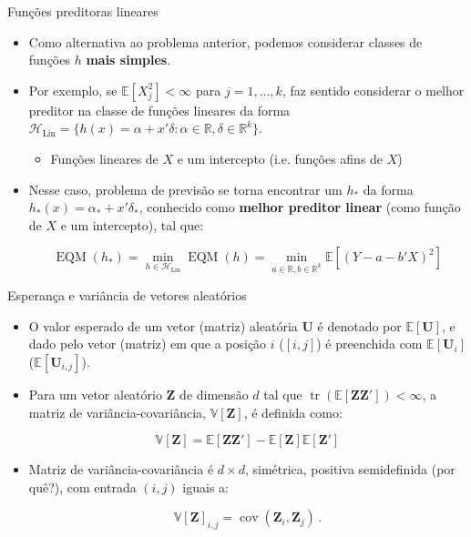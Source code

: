 \documentclass[11pt]{beamer}
\begin{document}
\begin{frame}{Funções preditoras lineares}
	\begin{itemize}
		\item Como alternativa ao problema anterior, podemos considerar classes de funções $h$ \textbf{mais simples}.
		\item Por exemplo, se $\mathbb{E}[X_j^2] < \infty$ para $j=1,\ldots, k$, faz sentido considerar o melhor preditor na classe de funções lineares da forma $\mathcal{H}_{\text{Lin}} = \{h(x) = \alpha + x'\delta: \alpha \in \mathbb{R}, \delta \in \mathbb{R}^k \}$.
				\begin{itemize}
			\item Funções lineares de ${X}$ e um intercepto (i.e. funções afins de ${X}$)
		\end{itemize}
		\item Nesse caso, problema de previsão se torna encontrar um $h_*$ da forma $h_*(x) = \alpha_* + x'\delta_*$, conhecido como \textbf{melhor preditor linear} (como função de ${X}$ e um intercepto), tal que:
		
		$$\operatorname{EQM}(h_*) = \min_{h \in \mathcal{H}_{\text{Lin}}} \operatorname{EQM}(h)= \min_{a \in \mathbb{R}, b \in \mathbb{R}^k}\mathbb{E}[(Y-a-b'X)^2] $$
	\end{itemize}
\end{frame}
\begin{frame}{Esperança e variância de vetores aleatórios}
\begin{itemize}
	\item O valor esperado de um vetor (matriz) aleatória $\boldsymbol{U}$ é denotado por $\mathbb{E}[\boldsymbol{U}]$, e dado pelo vetor (matriz) em que a posição $i$ ($[i,j]$) é preenchida com $\mathbb{E}[\boldsymbol{U}_i]$ ($\mathbb{E}[\boldsymbol{U}_{i,j}]$).
	\item Para um vetor aleatório $\boldsymbol{Z}$ de dimensão $d$ tal que $\operatorname{tr}(\mathbb{E}[\boldsymbol{Z}\boldsymbol{Z}'])<\infty$, a matriz de variância-covariância, $\mathbb{V}[\boldsymbol{Z}] $, é definida como:
	
	$$\mathbb{V}[\boldsymbol{Z}]  = \mathbb{E}[\boldsymbol{Z}\boldsymbol{Z}'] - \mathbb{E}[\boldsymbol{Z}]\mathbb{E}[\boldsymbol{Z}']$$
	
	\item Matriz de variância-covariância é $d \times d$, simétrica, positiva semidefinida (por quê?), com entrada $(i,j)$ iguais a:
	
	$$\mathbb{V}[\boldsymbol{Z}]_{i,j}= \operatorname{cov}(\boldsymbol{Z}_i,\boldsymbol{Z}_j)\, .$$
	
\end{itemize}
\end{frame}
\end{document}
